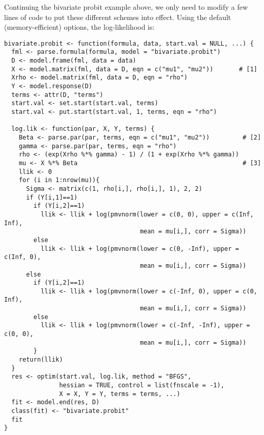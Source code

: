 Continuing the bivariate probit example above, we only need to modify
a few lines of code to put these different schemes into effect.  Using the
default (memory-efficient) options, the log-likelihood is: 
\begin{verbatim}
bivariate.probit <- function(formula, data, start.val = NULL, ...) {
  fml <- parse.formula(formula, model = "bivariate.probit")
  D <- model.frame(fml, data = data)
  X <- model.matrix(fml, data = D, eqn = c("mu1", "mu2"))       # [1]
  Xrho <- model.matrix(fml, data = D, eqn = "rho")
  Y <- model.response(D)
  terms <- attr(D, "terms")
  start.val <- set.start(start.val, terms)
  start.val <- put.start(start.val, 1, terms, eqn = "rho")

  log.lik <- function(par, X, Y, terms) {
    Beta <- parse.par(par, terms, eqn = c("mu1", "mu2"))         # [2]
    gamma <- parse.par(par, terms, eqn = "rho")
    rho <- (exp(Xrho %*% gamma) - 1) / (1 + exp(Xrho %*% gamma))
    mu <- X %*% Beta                                             # [3]
    llik <- 0
    for (i in 1:nrow(mu)){
      Sigma <- matrix(c(1, rho[i,], rho[i,], 1), 2, 2)
      if (Y[i,1]==1)
        if (Y[i,2]==1)
          llik <- llik + log(pmvnorm(lower = c(0, 0), upper = c(Inf, Inf), 
                                     mean = mu[i,], corr = Sigma))
        else
          llik <- llik + log(pmvnorm(lower = c(0, -Inf), upper = c(Inf, 0), 
                                     mean = mu[i,], corr = Sigma))
      else
        if (Y[i,2]==1)
          llik <- llik + log(pmvnorm(lower = c(-Inf, 0), upper = c(0, Inf),
                                     mean = mu[i,], corr = Sigma))
        else
          llik <- llik + log(pmvnorm(lower = c(-Inf, -Inf), upper = c(0, 0), 
                                     mean = mu[i,], corr = Sigma))
        }
    return(llik)
  }
  res <- optim(start.val, log.lik, method = "BFGS",
               hessian = TRUE, control = list(fnscale = -1),
               X = X, Y = Y, terms = terms, ...)
  fit <- model.end(res, D)
  class(fit) <- "bivariate.probit"
  fit
}
\end{verbatim}

